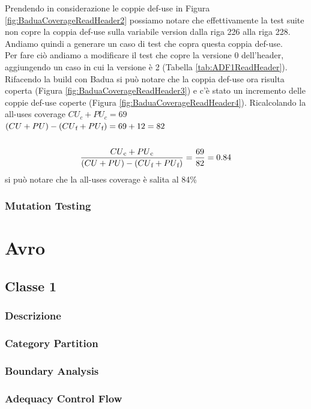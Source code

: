 \documentclass[12pt, a4paper]{article}
\begin{document}
Prendendo in considerazione le coppie def-use in Figura \ref{fig:BaduaCoverageReadHeader2} possiamo notare che
effettivamente la test suite non copre la coppia def-use sulla variabile version dalla riga 226 alla riga 228.
Andiamo quindi a generare un caso di test che copra questa coppia def-use. \\

Per fare ciò andiamo a modificare il test che copre la versione 0 dell'header, aggiungendo un caso in cui la versione
è 2 (Tabella \ref{tab:ADF1ReadHeader}).  Rifacendo la build con Badua si può notare che la coppia def-use ora risulta coperta (Figura \ref{fig:BaduaCoverageReadHeader3})
e c'è stato un incremento delle coppie def-use coperte (Figura \ref{fig:BaduaCoverageReadHeader4}). Ricalcolando
la all-uses coverage 
\(CU_c + PU_c = 69\) \\
\( (CU + PU) - (CU\textsubscript{f} + PU\textsubscript{f}) = 69 + 12 = 82\) \\ \\
\[\frac{{CU\textsubscript{c} + PU\textsubscript{c}}}{{(CU + PU) - (CU\textsubscript{f} + PU\textsubscript{f})}} = \frac{{69}}{{82}} = 0.84\]
si può notare che la all-uses coverage è salita al 84\% \\

\subsubsection{Mutation Testing}



\section{Avro}
\subsection{Classe 1}
\subsubsection{Descrizione}
\subsubsection{Category Partition}
\subsubsection{Boundary Analysis}
\subsubsection{Adequacy Control Flow}
\end{document}
